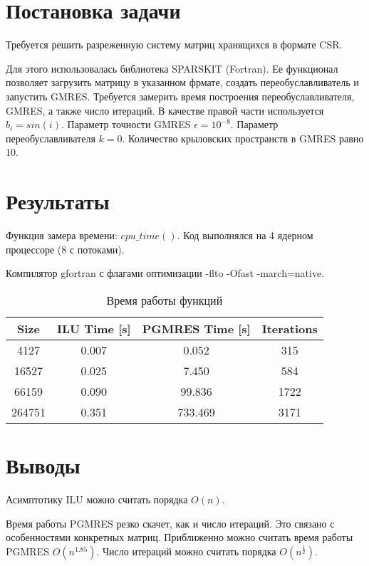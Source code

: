 


	\tableofcontents
	
	\section{Постановка задачи}
	
	 Требуется решить разреженную систему матриц хранящихся в формате CSR.
	 
	  Для этого использовалась библиотека SPARSKIT (Fortran). Ее функционал позволяет загрузить матрицу в указанном фрмате, создать переобуславливатель и запустить GMRES.
Требуется замерить время построения переобуславливателя, GMRES, а также число итераций. В качестве правой части используется $b_i = sin(i)$. Параметр точности GMRES $\epsilon = 10^{-8}$. Параметр переобуславливателя $k = 0$. Количество крыловских пространств в GMRES равно 10.

	\section{Результаты}
	
	Функция замера времени: $cpu \_ time()$. Код выполнялся на  4 ядерном процессоре (8 с потоками).
	
	Компилятор gfortran с флагами оптимизации -flto -Ofast -march=native.
	
\begin{table}[h!]
	\centering
	\begin{tabular}{|c|c|c|c|}
		\hline
		Size  & ILU Time [s] & PGMRES Time [s] & Iterations\\ \hline
		4127 & 0.007 &  0.052  & 315 \\ 
		\hline
		16527 & 0.025 & 7.450 & 584 \\
		\hline
		66159 & 0.090 & 99.836 & 1722\\
		\hline
		264751 & 0.351 & 733.469 & 3171\\
		\hline	
	\end{tabular}
	\caption{Время работы функций}
	\label{table:1}
\end{table}
	
	\section{Выводы}
	
	Асимптотику ILU можно считать порядка $O(n)$. 
	
	Время работы PGMRES резко скачет, как и число итераций. Это связано с особенностями конкретных матриц. Приближенно можно считать время работы PGMRES $O(n^1.85)$. Число итераций можно считать порядка $O(n^{\frac{1}{2}})$.	



